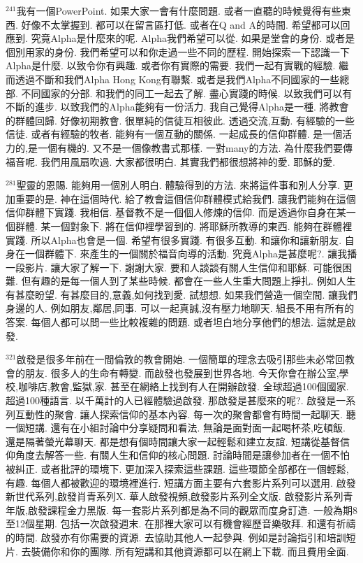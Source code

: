 \documentclass{book}
\begin{document}
$^{241}$我有一個PowerPoint.
如果大家一會有什麼問題.
或者一直聽的時候覺得有些東西.
好像不太掌握到.
都可以在留言區打低.
或者在Q and A的時間.
希望都可以回應到.
究竟Alpha是什麼來的呢.
Alpha我們希望可以從.
如果是堂會的身份.
或者是個別用家的身份.
我們希望可以和你走過一些不同的歷程.
開始探索一下認識一下Alpha是什麼.
以致令你有興趣.
或者你有實際的需要.
我們一起有實戰的經驗.
繼而透過不斷和我們Alpha Hong Kong有聯繫.
或者是我們Alpha不同國家的一些總部.
不同國家的分部.
和我們的同工一起去了解.
盡心實踐的時候.
以致我們可以有不斷的進步.
以致我們的Alpha能夠有一份活力.
我自己覺得Alpha是一種.
將教會的群體回歸.
好像初期教會.
很單純的信徒互相彼此.
透過交流,互動.
有經驗的一些信徒.
或者有經驗的牧者.
能夠有一個互動的關係.
一起成長的信仰群體.
是一個活力的,是一個有機的.
又不是一個像教書式那樣.
一對many的方法.
為什麼我們要傳福音呢.
我們用風扇吹過.
大家都很明白.
其實我們都很想將神的愛.
耶穌的愛.

$^{281}$聖靈的恩賜.
能夠用一個別人明白.
體驗得到的方法.
來將這件事和別人分享.
更加重要的是.
神在這個時代.
給了教會這個信仰群體模式給我們.
讓我們能夠在這個信仰群體下實踐.
我相信.
基督教不是一個個人修煉的信仰.
而是透過你自身在某一個群體.
某一個對象下.
將在信仰裡學習到的.
將耶穌所教導的東西.
能夠在群體裡實踐.
所以Alpha也會是一個.
希望有很多實踐.
有很多互動.
和讓你和讓新朋友.
自身在一個群體下.
來產生的一個關於福音向導的活動.
究竟Alpha是甚麼呢?.
讓我播一段影片.
讓大家了解一下.
謝謝大家.
要和人談談有關人生信仰和耶穌.
可能很困難.
但有趣的是每一個人到了某些時候.
都會在一些人生重大問題上掙扎.
例如人生有甚麼盼望.
有甚麼目的,意義,如何找到愛.
試想想.
如果我們營造一個空間.
讓我們身邊的人.
例如朋友,鄰居,同事.
可以一起真誠,沒有壓力地聊天.
組長不用有所有的答案.
每個人都可以問一些比較複雜的問題.
或者坦白地分享他們的想法.
這就是啟發.

$^{321}$啟發是很多年前在一間倫敦的教會開始.
一個簡單的理念去吸引那些未必常回教會的朋友.
很多人的生命有轉變.
而啟發也發展到世界各地.
今天你會在辦公室,學校,咖啡店,教會,監獄,家.
甚至在網絡上找到有人在開辦啟發.
全球超過100個國家.
超過100種語言.
以千萬計的人已經體驗過啟發.
那啟發是甚麼來的呢?.
啟發是一系列互動性的聚會.
讓人探索信仰的基本內容.
每一次的聚會都會有時間一起聊天.
聽一個短講.
還有在小組討論中分享疑問和看法.
無論是面對面一起喝杯茶,吃頓飯.
還是隔著螢光幕聊天.
都是想有個時間讓大家一起輕鬆和建立友誼.
短講從基督信仰角度去解答一些.
有關人生和信仰的核心問題.
討論時間是讓參加者在一個不怕被糾正.
或者批評的環境下.
更加深入探索這些課題.
這些環節全部都在一個輕鬆,有趣.
每個人都被歡迎的環境裡進行.
短講方面主要有六套影片系列可以選用.
啟發新世代系列,啟發肖青系列X.
華人啟發視頻,啟發影片系列全文版.
啟發影片系列青年版,啟發課程金力黑版.
每一套影片系列都是為不同的觀眾而度身訂造.
一般為期8至12個星期.
包括一次啟發週末.
在那裡大家可以有機會經歷音樂敬拜.
和還有祈禱的時間.
啟發亦有你需要的資源.
去協助其他人一起參與.
例如是討論指引和培訓短片.
去裝備你和你的團隊.
所有短講和其他資源都可以在網上下載.
而且費用全面.
\end{document}
